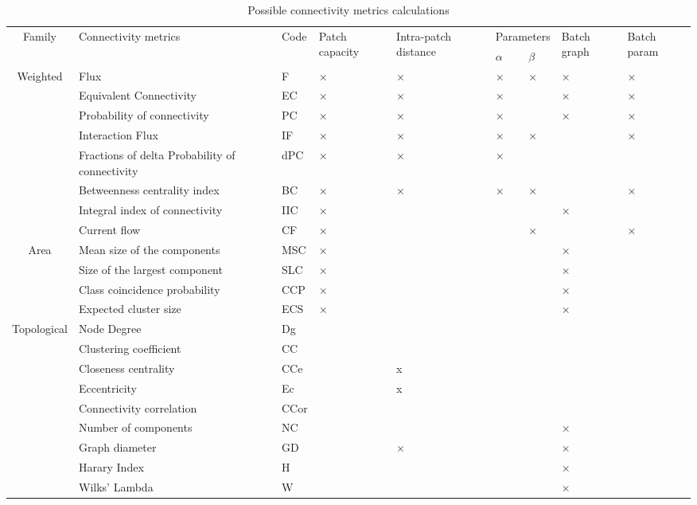 \documentclass{article}
\begin{document}
\begin{table}[H]
\begin{tabular}{|c|p{5cm}|l|l|l|p{0.8cm}|p{0.8cm}|p{1cm}|p{1.3cm}|}
\hline
\multirow{2}{*}{Family} & \multirow{2}{*}{Connectivity metrics} & \multirow{2}{*}{Code} & \multirow{2}{*}{\parbox{1.3cm}{Patch capacity}} & \multirow{2}{*}{\parbox{1.3cm}{Intra-patch distance}}  & \multicolumn{2}{m{1.8cm}|}{\centering Parameters} & \multirow{2}{*}{\parbox{1.3cm}{Batch graph}} & \multirow{2}{*}{\parbox{1.3cm}{Batch param}}\\
\hhline{~~~~~--~~}
 & & & & & $\alpha$ & $\beta$ & & \\
\hline
\multirow{6}{*}{Weighted} 
 & Flux & F & × & × & × & × & × & ×\\
 & Equivalent Connectivity & EC & × & × & × & & × & ×\\
 & Probability of connectivity & PC & × & × & × & & × & ×\\
 & Interaction Flux  & IF & × & × & × & × &  & ×\\
 & Fractions of delta Probability of connectivity & dPC & × & × & × &  &  &\\
 & Betweenness centrality index & BC & × & × & × & × &  &×\\
 & Integral index of connectivity & IIC & × &  &  &  & × & \\
 & Current flow & CF & × &  &  & × &  & ×\\
\hline
\multirow{4}{*}{Area} 
 & Mean size of the components & MSC & × &  &  &  & × & \\
 & Size of the largest component & SLC & × &  &  &  & × & \\
 & Class coincidence probability & CCP & × &  &  &  & × & \\
 & Expected cluster size & ECS & × &  &  &  & × & \\
\hline
\multirow{9}{*}{Topological} 
 & Node Degree & Dg &  &  &  &  &  & \\
 & Clustering coefficient  & CC &  &  &  &  &  & \\
 & Closeness centrality & CCe &   & x &  &  &  & \\
 & Eccentricity & Ec &  & x &  &  &  & \\
 & Connectivity correlation & CCor &  &  &  &  &  & \\
 & Number of components & NC &  &  &  &  & × & \\
 & Graph diameter & GD &  & × &  &  & × & \\
 & Harary Index & H &  &  &  &  & × & \\
 & Wilks' Lambda & W &  &  &  &  & × & \\
\hline
\end{tabular}
\caption{Possible connectivity metrics calculations}
\label{metric_poss}
\end{table}
\end{document}
